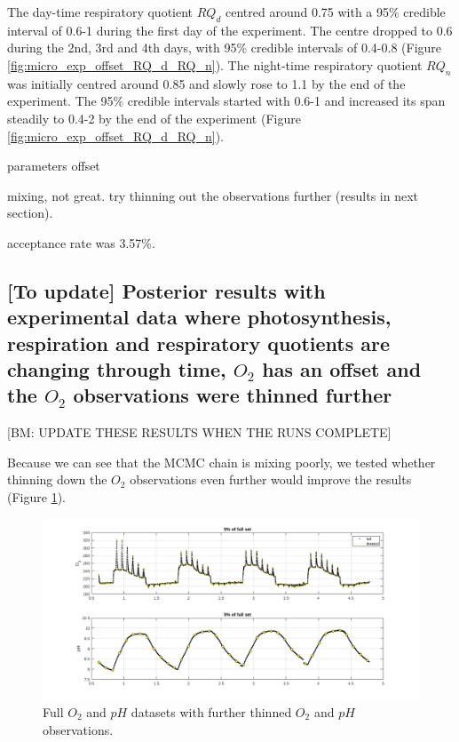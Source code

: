 \documentclass{ruthesis}
\begin{document}
The day-time respiratory quotient $RQ_d$ centred around 0.75 with a 95\% credible interval of 0.6-1 during the first day of the experiment. The centre dropped to 0.6 during the 2nd, 3rd and 4th days, with 95\% credible intervals of 0.4-0.8 (Figure \ref{fig:micro_exp_offset_RQ_d_RQ_n}). The night-time respiratory quotient $RQ_n$ was initially centred around 0.85 and slowly rose to 1.1 by the end of the experiment. The 95\% credible intervals started with 0.6-1 and increased its span steadily to 0.4-2 by the end of the experiment (Figure \ref{fig:micro_exp_offset_RQ_d_RQ_n}).

parameters
offset

mixing, not great. try thinning out the observations further (results in next section).

acceptance rate was 3.57\%.





\FloatBarrier
\subsection{[To update] Posterior results with experimental data where photosynthesis, respiration and respiratory quotients are changing through time, $O_2$ has an offset and the $O_2$ observations were thinned further}

[BM: UPDATE THESE RESULTS WHEN THE RUNS COMPLETE]

Because we can see that the MCMC chain is mixing poorly, we tested whether thinning down the $O_2$ observations even further would improve the results (Figure \ref{fig:thinned_obs_further_micro}).

\begin{figure}
	\centerline{\includegraphics[width=1.25\textwidth]{images_microalgae/plots/thinned_obs_micro_further}}
	\caption[.]{Full $O_2$ and $pH$ datasets with further thinned $O_2$ and $pH$ observations.}
	\label{fig:thinned_obs_further_micro}
\end{figure}
\end{document}
